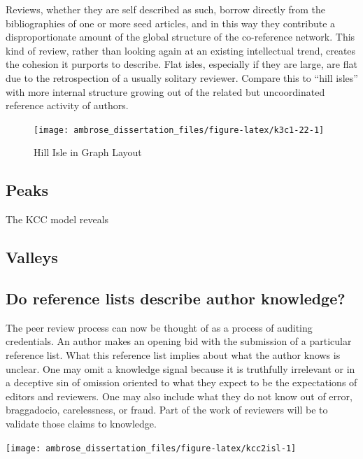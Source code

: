 \documentclass[]{book}
\theoremstyle{definition}
\theoremstyle{definition}
\theoremstyle{definition}
\theoremstyle{remark}
\begin{document}
Reviews, whether they are self described as such, borrow directly from
the bibliographies of one or more seed articles, and in this way they
contribute a disproportionate amount of the global structure of the
co-reference network. This kind of review, rather than looking again at
an existing intellectual trend, creates the cohesion it purports to
describe. Flat isles, especially if they are large, are flat due to the
retrospection of a usually solitary reviewer. Compare this to ``hill
isles'' with more internal structure growing out of the related but
uncoordinated reference activity of authors.

\begin{figure}

{\centering \texttt{[image: ambrose\_dissertation\_files/figure-latex/k3c1-22-1]} 

}

\caption{Hill Isle in Graph Layout}\label{fig:k3c1-22}
\end{figure}

\hypertarget{peaks}{%
\subsection{Peaks}\label{peaks}}

The KCC model reveals

\hypertarget{valleys}{%
\subsection{Valleys}\label{valleys}}

\hypertarget{do-reference-lists-describe-author-knowledge}{%
\subsection{Do reference lists describe author
knowledge?}\label{do-reference-lists-describe-author-knowledge}}

The peer review process can now be thought of as a process of auditing
credentials. An author makes an opening bid with the submission of a
particular reference list. What this reference list implies about what
the author knows is unclear. One may omit a knowledge signal because it
is truthfully irrelevant or in a deceptive sin of omission oriented to
what they expect to be the expectations of editors and reviewers. One
may also include what they do not know out of error, braggadocio,
carelessness, or fraud. Part of the work of reviewers will be to
validate those claims to knowledge.

\begin{center}\texttt{[image: ambrose\_dissertation\_files/figure-latex/kcc2isl-1]} \end{center}


\end{document}
